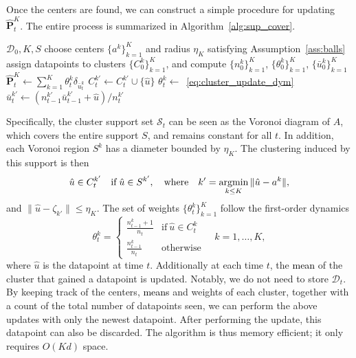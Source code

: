 \documentclass[12pt]{article}
\newcommand{\bnote}[1]{\textcolor{purple}{\textbf{[B: #1]}}}
\newcommand{\eg}{{\it e.g.}}
\newcommand{\prob}{{\mathbf P}}
\newcommand{\supp}{S}
\newcommand{\unc}{u}
\newcommand{\eps}{\varepsilon^K}
\newcommand{\argmin}{\mathop{\rm argmin}}
\newcommand{\RC}[1]{\textcolor{black}{#1}}
\newcommand{\RC}[1]{\textcolor{blue}{#1}}
\begin{document}
Once the centers are found, we can construct a simple procedure for updating~$\hat{\prob}^K_t$. \ifpreprint The entire process is summarized in Algorithm~\ref{alg:sup_cover}.
\begin{algorithm}[ht]
	\caption{SupCover}
	\label{alg:sup_cover}
	\begin{algorithmic}[1]
	  $\mathcal{D}_0, K,\supp$
     \State choose centers $\{a^k\}_{k=1}^K$ and radius $\eta_K$ satisfying Assumption~\ref{ass:balls}
      \State assign datapoints to clusters $\{C^k_0\}_{k=1}^K$, and compute $\{n^k_0\}_{k=1}^K$, $\{\theta^k_0\}_{k=1}^K$, $\{\bar{u}_0^k\}_{k=1}^K$
     \State  $\hat{\mathbf{P}}^K_t \gets \sum_{k=1}^{K}\theta_t^k\delta_{\bar{u}_t^k}$
 \State $C_t^{k'} \gets C_t^{k'} \cup \{\hat{u}\}$ 
 \State $\theta^k_t\gets$~\eqref{eq:cluster_update_dym} 
     \State $\bar{u}^{k'}_t \gets (n^{k'}_{t-1}\bar{u}^{k'}_{t-1} + \hat{u})/n^{k'}_t$ \Comment{update \RC{mean}}
  \EndFor
	\end{algorithmic}
\end{algorithm} 
\fi
Specifically, the cluster support set $\mathcal{S}_t$ can be seen as the Voronoi diagram of $A$, which covers the entire support $S$, and remains constant for all $t$. In addition, each Voronoi region $S^k$ has a diameter bounded by $\eta_K$. The clustering induced by this support is then
\begin{equation}
\label{eq:assign_ball}
    \hat{u} \in C_t^{k'} \quad \text{if}\;  \hat{u} \in S^{k'}, \quad\text{where}\quad k'=\argmin_{k\leq K} \|\hat{u} - a^k\|,
\end{equation}
and $\|\hat{u} - \zeta_{k'}\| \leq \eta_K$.
The  set of weights $\{\theta^k_t\}_{k=1}^K$ follow the first-order dynamics
\begin{equation}
\label{eq:cluster_update_dym}
\theta^k_{t} = \begin{cases}
\frac{n^k_{t-1} + 1}{n_{t}} & \text{if} \:\hat{\unc} \in C^k_{t}\\
\frac{n^k_{t-1}}{n_{t}} & \text{otherwise}
\end{cases}\quad k=1,\dots, K,
\end{equation}
where $\hat{u}$ is the datapoint at time $t$. Additionally at each time $t$, the \RC{mean} of the cluster that gained a datapoint is updated.
Notably, we do not need to store $\mathcal{D}_t$. By keeping track of the centers, \RC{means} and weights of each cluster, together with a count of the total number of datapoints seen, we can perform the above updates with only the newest datapoint. After performing the update, this datapoint can also be discarded. The algorithm is thus memory efficient; it only requires $O(Kd)$ space. 
\end{document}
